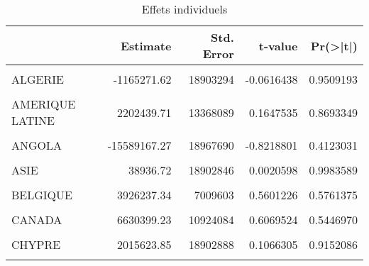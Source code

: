 \documentclass[
]{book}
\begin{document}
\begin{table}

\caption{\label{tab:unnamed-chunk-51}Effets individuels }
\centering
\begin{tabular}[t]{l|r|r|r|r}
\hline
  & Estimate & Std. Error & t-value & Pr(>|t|)\\
\hline
\cellcolor{gray!6}{AFRIQUE DU SUD} & \cellcolor{gray!6}{-2984326.03} & \cellcolor{gray!6}{8460861} & \cellcolor{gray!6}{-0.3527213} & \cellcolor{gray!6}{0.7247369}\\
\hline
ALGERIE & -1165271.62 & 18903294 & -0.0616438 & 0.9509193\\
\hline
\cellcolor{gray!6}{ALLEMAGNE} & \cellcolor{gray!6}{-1632580.61} & \cellcolor{gray!6}{7723181} & \cellcolor{gray!6}{-0.2113871} & \cellcolor{gray!6}{0.8328399}\\
\hline
AMERIQUE LATINE & 2202439.71 & 13368089 & 0.1647535 & 0.8693349\\
\hline
\cellcolor{gray!6}{GRANDE BRATAGNE} & \cellcolor{gray!6}{-3470934.54} & \cellcolor{gray!6}{6056452} & \cellcolor{gray!6}{-0.5730970} & \cellcolor{gray!6}{0.5673408}\\
\hline
ANGOLA & -15589167.27 & 18967690 & -0.8218801 & 0.4123031\\
\hline
\cellcolor{gray!6}{ARABIE} & \cellcolor{gray!6}{-142028.25} & \cellcolor{gray!6}{18902837} & \cellcolor{gray!6}{-0.0075136} & \cellcolor{gray!6}{0.9940139}\\
\hline
ASIE & 38936.72 & 18902846 & 0.0020598 & 0.9983589\\
\hline
\cellcolor{gray!6}{AUSTRALIE} & \cellcolor{gray!6}{285990.29} & \cellcolor{gray!6}{18902686} & \cellcolor{gray!6}{0.0151296} & \cellcolor{gray!6}{0.9879466}\\
\hline
BELGIQUE & 3926237.34 & 7009603 & 0.5601226 & 0.5761375\\
\hline
\cellcolor{gray!6}{BURUNDI} & \cellcolor{gray!6}{-315018.56} & \cellcolor{gray!6}{6301266} & \cellcolor{gray!6}{-0.0499929} & \cellcolor{gray!6}{0.9601871}\\
\hline
CANADA & 6630399.23 & 10924084 & 0.6069524 & 0.5446970\\
\hline
\cellcolor{gray!6}{CHINE} & \cellcolor{gray!6}{21758300.68} & \cellcolor{gray!6}{6513971} & \cellcolor{gray!6}{3.3402513} & \cellcolor{gray!6}{0.0010301}\\
\hline
CHYPRE & 2015623.85 & 18902888 & 0.1066305 & 0.9152086\\
\hline
\cellcolor{gray!6}{CONGO BRAZA} & \cellcolor{gray!6}{355028.22} & \cellcolor{gray!6}{18902684} & \cellcolor{gray!6}{0.0187819} & \cellcolor{gray!6}{0.9850373}\\

\end{tabular}
\end{table}
\end{document}
